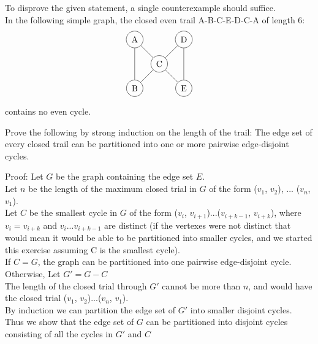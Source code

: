\documentclass[12pt]{article}
\newenvironment{question}[2][Question]{\begin{trivlist}
\item[\hskip \labelsep {\bfseries #1}\hskip \labelsep {\bfseries #2.}]}{\end{trivlist}}
\begin{document}
To disprove the given statement, a single counterexample should suffice.\\
In the following simple graph, the closed even trail A-B-C-E-D-C-A of length 6:\\
\begin{align*}
\begin{tikzpicture}
\node[shape=circle,draw=black] (B) at (1,0) {A};
\node[shape=circle,draw=black] (D) at (1,-2) {B};
\node[shape=circle,draw=black] (E) at (2,-1) {C};
\node[shape=circle,draw=black] (F) at (3,0) {D};
\node[shape=circle,draw=black] (H) at (3,-2) {E};
\path [] (B) edge node[left] {} (E);
\path [] (D) edge node[left] {} (E);
\path [] (E) edge node[left] {} (F);
\path [] (H) edge node[left] {} (E);
\path [] (B) edge node[left] {} (D);
\path [] (F) edge node[left] {} (H);
\end{tikzpicture}
\end{align*}
contains no even cycle.

\begin{question}{3}
Prove the following by strong induction on the length of the trail: The edge set of every closed trail can be partitioned into one or more pairwise edge-disjoint cycles.
\end{question}

Proof: Let $G$ be the graph containing the edge set $E$. \\

Let $n$ be the length of the maximum closed trial in $G$ of the form ($v_1$, $v_2$), ... ($v_n$, $v_1$). \\

Let $C$ be the smallest cycle in $G$ of the form ($v_i$, $v_{i+1}$)...($v_{i+k-1}$, $v_{i+k}$), where $v_i = v_{i+k}$ and $v_i$...$v_{i+k-1}$ are distinct (if the vertexes were not distinct that would mean it would be able to be partitioned into smaller cycles, and we started this exercise assuming C is the smallest cycle). \\

If $C = G$, the graph can be partitioned into one pairwise edge-disjoint cycle.\\

Otherwise, Let $G' = G - C$\\

The length of the closed trial through $G'$ cannot be more than $n$, and would have the closed trial ($v_1$, $v_2$)...($v_n$, $v_1$). \\

By induction we can partition the edge set of $G'$ into smaller disjoint cycles. Thus we show that the edge set of $G$ can be partitioned into disjoint cycles consisting of all the cycles in $G'$ and $C$\\
\end{document}
